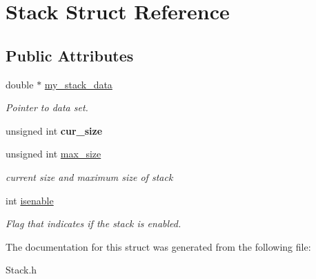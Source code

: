 \hypertarget{structStack}{\section{Stack Struct Reference}
\label{structStack}
}
\subsection*{Public Attributes}
\begin{DoxyCompactItemize}
\item 
\hypertarget{structStack_a4504e8bc8c1380c3eac8eee467751d5b}{double $\ast$ \hyperlink{structStack_a4504e8bc8c1380c3eac8eee467751d5b}{my\-\_\-stack\-\_\-data}}\label{structStack_a4504e8bc8c1380c3eac8eee467751d5b}

\begin{DoxyCompactList}\small\item\em Pointer to data set. \end{DoxyCompactList}\item 
\hypertarget{structStack_a33014d5dcd0a3db739a0ecd207367ac2}{unsigned int {\bfseries cur\-\_\-size}}\label{structStack_a33014d5dcd0a3db739a0ecd207367ac2}

\item 
\hypertarget{structStack_a67360097b9a641e39a5ace138393cf81}{unsigned int \hyperlink{structStack_a67360097b9a641e39a5ace138393cf81}{max\-\_\-size}}\label{structStack_a67360097b9a641e39a5ace138393cf81}

\begin{DoxyCompactList}\small\item\em current size and maximum size of stack \end{DoxyCompactList}\item 
\hypertarget{structStack_acbdc314851b1322ee74f2790ab9fbc36}{int \hyperlink{structStack_acbdc314851b1322ee74f2790ab9fbc36}{isenable}}\label{structStack_acbdc314851b1322ee74f2790ab9fbc36}

\begin{DoxyCompactList}\small\item\em Flag that indicates if the stack is enabled. \end{DoxyCompactList}\end{DoxyCompactItemize}


The documentation for this struct was generated from the following file\-:\begin{DoxyCompactItemize}
\item 
Stack.\-h\end{DoxyCompactItemize}
